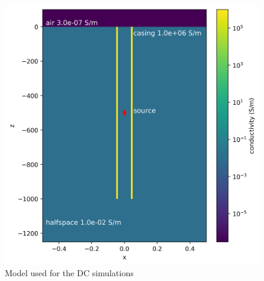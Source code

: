 \begin{figure}[htb]
    \begin{center}
    \includegraphics[width=0.4\columnwidth]{figures/casing_software/kaufman_setup.png}
    \end{center}
\caption{Model used for the DC simulations}
\label{fig:kaufman_setup}
\end{figure}
